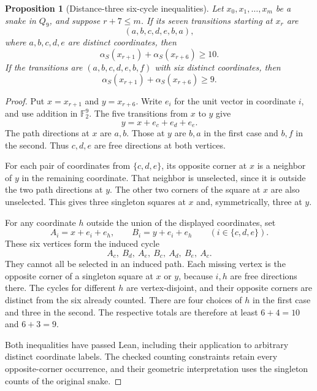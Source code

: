 \documentclass[11pt,a4paper]{article}
\newtheorem{proposition}[theorem]{Proposition}
\theoremstyle{definition}
\theoremstyle{remark}
\newcommand{\Q}{Q}
\begin{document}
\begin{proposition}[Distance-three six-cycle inequalities]\label{prop:distance-three-pair}
Let $x_0,x_1,\ldots,x_m$ be a snake in $\Q_9$, and suppose $r+7\le m$.
If its seven transitions starting at $x_r$ are
\[
(a,b,c,d,e,b,a),
\]
where $a,b,c,d,e$ are distinct coordinates, then
\[
\alpha_S(x_{r+1})+\alpha_S(x_{r+6})\ge10.
\]
If the transitions are $(a,b,c,d,e,b,f)$ with six distinct coordinates, then
\[
\alpha_S(x_{r+1})+\alpha_S(x_{r+6})\ge9.
\]
\end{proposition}
\begin{proof}
Put $x=x_{r+1}$ and $y=x_{r+6}$. Write $e_i$ for the unit vector in coordinate $i$, and use addition in $\mathbb F_2^9$. The five transitions from $x$ to $y$ give
\[
y=x+e_c+e_d+e_e.
\]
The path directions at $x$ are $a,b$. Those at $y$ are $b,a$ in the first case and $b,f$ in the second. Thus $c,d,e$ are free directions at both vertices.

For each pair of coordinates from $\{c,d,e\}$, its opposite corner at $x$ is a neighbor of $y$ in the remaining coordinate. That neighbor is unselected, since it is outside the two path directions at $y$. The other two corners of the square at $x$ are also unselected. This gives three singleton squares at $x$ and, symmetrically, three at $y$.

For any coordinate $h$ outside the union of the displayed coordinates, set
\[
A_i=x+e_i+e_h,\qquad B_i=y+e_i+e_h\qquad(i\in\{c,d,e\}).
\]
These six vertices form the induced cycle
\[
A_c,\ B_d,\ A_e,\ B_c,\ A_d,\ B_e,\ A_c.
\]
They cannot all be selected in an induced path. Each missing vertex is the opposite corner of a singleton square at $x$ or $y$, because $i,h$ are free directions there. The cycles for different $h$ are vertex-disjoint, and their opposite corners are distinct from the six already counted. There are four choices of $h$ in the first case and three in the second. The respective totals are therefore at least $6+4=10$ and $6+3=9$.

Both inequalities have passed Lean, including their application to arbitrary distinct coordinate labels. The checked counting constraints retain every opposite-corner occurrence, and their geometric interpretation uses the singleton counts of the original snake.
\end{proof}
\end{document}
